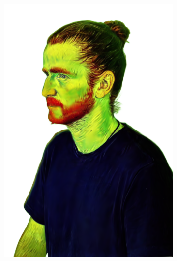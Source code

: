 \begin{figure}[ht]
\begin{subfigure}{0.2\linewidth}
		\includegraphics[width=\textwidth]{Figures/results/high/ephra_vangogh/25_render.png}

\end{subfigure}
\end{figure}
